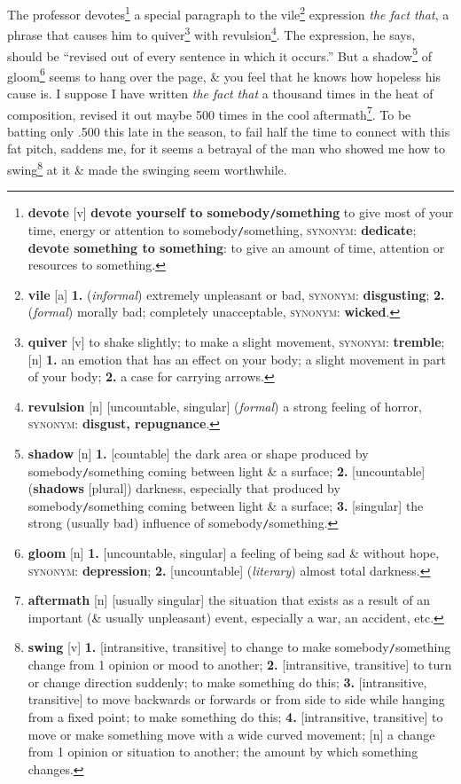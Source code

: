 \documentclass[oneside]{book}
\numberwithin{equation}{section}
\begin{document}
The professor devotes\footnote{\textbf{devote} [v] \textbf{devote yourself to somebody\texttt{/}something} to give most of your time, energy or attention to somebody\texttt{/}something, \textsc{synonym}: \textbf{dedicate}; \textbf{devote something to something}: to give an amount of time, attention or resources to something.} a special paragraph to the vile\footnote{\textbf{vile} [a] \textbf{1.} (\textit{informal}) extremely unpleasant or bad, \textsc{synonym}: \textbf{disgusting}; \textbf{2.} (\textit{formal}) morally bad; completely unacceptable, \textsc{synonym}: \textbf{wicked}.} expression \textit{the fact that}, a phrase that causes him to quiver\footnote{\textbf{quiver} [v] to shake slightly; to make a slight movement, \textsc{synonym}: \textbf{tremble}; [n] \textbf{1.} an emotion that has an effect on your body; a slight movement in part of your body; \textbf{2.} a case for carrying arrows.} with revulsion\footnote{\textbf{revulsion} [n] [uncountable, singular] (\textit{formal}) a strong feeling of horror, \textsc{synonym}: \textbf{disgust, repugnance}.}. The expression, he says, should be ``revised out of every sentence in which it occurs.'' But a shadow\footnote{\textbf{shadow} [n] \textbf{1.} [countable] the dark area or shape produced by somebody\texttt{/}something coming between light \& a surface; \textbf{2.} [uncountable] (\textbf{shadows} [plural]) darkness, especially that produced by somebody\texttt{/}something coming between light \& a surface; \textbf{3.} [singular] the strong (usually bad) influence of somebody\texttt{/}something.} of gloom\footnote{\textbf{gloom} [n] \textbf{1.} [uncountable, singular] a feeling of being sad \& without hope, \textsc{synonym}: \textbf{depression}; \textbf{2.} [uncountable] (\textit{literary}) almost total darkness.} seems to hang over the page, \& you feel that he knows how hopeless his cause is. I suppose I have written \textit{the fact that} a thousand times in the heat of composition, revised it out maybe 500 times in the cool aftermath\footnote{\textbf{aftermath} [n] [usually singular] the situation that exists as a result of an important (\& usually unpleasant) event, especially a war, an accident, etc.}. To be batting only .500 this late in the season, to fail half the time to connect with this fat pitch, saddens me, for it seems a betrayal of the man who showed me how to swing\footnote{\textbf{swing} [v] \textbf{1.} [intransitive, transitive] to change to make somebody\texttt{/}something change from 1 opinion or mood to another; \textbf{2.} [intransitive, transitive] to turn or change direction suddenly; to make something do this; \textbf{3.} [intransitive, transitive] to move backwards or forwards or from side to side while hanging from a fixed point; to make something do this; \textbf{4.} [intransitive, transitive] to move or make something move with a wide curved movement; [n] a change from 1 opinion or situation to another; the amount by which something changes.} at it \& made the swinging seem worthwhile.
\end{document}

